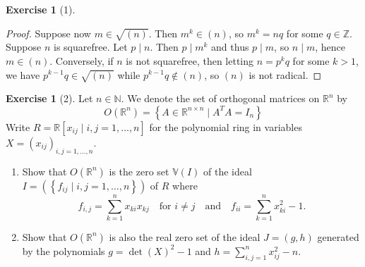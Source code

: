 \documentclass[reqno]{amsart}
\theoremstyle{definition}
\newtheorem{exercise}[theorem]{Exercise}
\theoremstyle{remark}
\begin{document}
\begin{exercise}[1]
\begin{proof}
             Suppose now
             $m \in \sqrt{\left( n \right) } $.
             Then $m^{k} \in \left( n \right) $, so
             $m^{k} = nq$ for some $q \in \mathbb{Z}$.
             Suppose $n$ is squarefree. Let
             $p  \mid n$. Then $p  \mid m^{k}$ and thus
             $p  \mid m$, so $n  \mid m$, hence
             $m \in \left( n \right) $. Conversely,
             if $n$ is not squarefree, then
             letting $n = p^k q$ for some $k>1$, we have
             $p^{k-1}q \in \sqrt{\left( n \right) } $ while
             $p^{k-1} q \not\in \left( n \right) $, so
             $\left( n \right) $ is not radical.
        \end{proof}
    \end{exercise}



    \begin{exercise}[2]
        Let $n \in \mathbb{N}$. We denote the set
        of orthogonal matrices on
        $\mathbb{R}^{n}$ by
        \[
        O \left( \mathbb{R}^{n} \right) 
        = \left\{ A \in \mathbb{R}^{n\times n}
         \mid A^{T} A = I_n \right\} 
        \] 
        Write $R = 
        \mathbb{R} \left[ x_{ij} \mid 
        i,j = 1,\ldots, n\right] $ for the polynomial
        ring in variables $X = \left( x_{ij} \right)_{i,j
        = 1,\ldots, n}$. 
        \begin{enumerate}
            \item Show that $O \left( \mathbb{R}^{n} \right) $ 
                is the zero set 
                $\mathbb{V} (I)$ of the ideal
                $I = 
                \left( \left\{ f_{ij}  \mid 
                i,j = 1,\ldots,n\right\}  \right) $  of
                $R$ where
                \[
                f_{i,j} = \sum_{k=1}^{n} x_{ki}x_{kj}
                \quad \text{for } i\neq j
                \quad \text{and} \quad
                f_{ii} = \sum_{k=1}^{n} x_{ki}^2 -1.
                \] 
            \item Show that $O \left( \mathbb{R}^{n} \right) $ 
                is also the real zero set of the ideal
                $J = \left( g,h \right) $ generated by
                the polynomials
                $g = \det (X)^2 -1$ and
                $h = \sum_{i,j=1}^{n} x_{ij}^2 -n$.
        \end{enumerate}
    \end{exercise}
\end{document}
